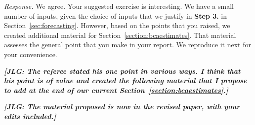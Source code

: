 \noindent \textit{Response.} We agree. Your suggested exercise is interesting. We have a small number of inputs, given the choice of inputs that we justify in \textbf{Step 3.} in Section~\ref{sec:forecasting}. However, based on the points that you raised, we created additional material for Section~\ref{section:bcaestimates}. That material assesses the general point that you make in your report. We reproduce it next for your convenience. 

\textit{\textbf{[JLG: The referee stated his one point in various ways. I think that his point is of value and created the following material that I propose to add at the end of our current Section~\ref{section:bcaestimates}.]}}

\textit{\textbf{[JLG: The material proposed is now in the revised paper, with your edits included.]}}
\singlespace




